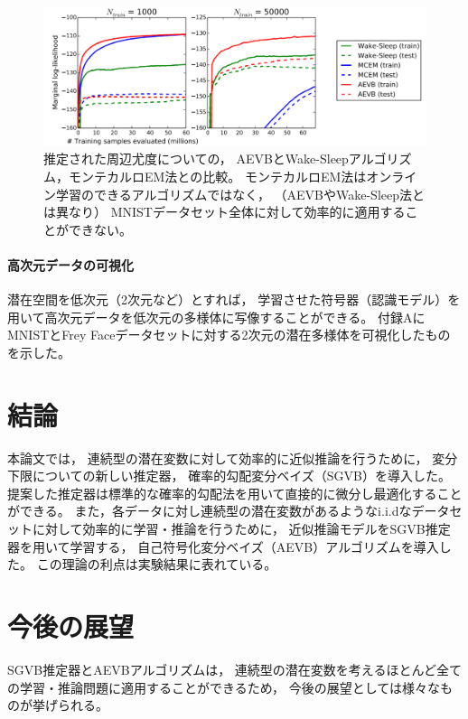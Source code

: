 \documentclass[dvipdfmx, fleqn, draft]{jsarticle}
\begin{document}
\begin{figure}
    \centering
    \includegraphics[clip, width=15cm]{../figures/comparison_MCMC}
    \caption{
        推定された周辺尤度についての，
        AEVBとWake-Sleepアルゴリズム，モンテカルロEM法との比較。
        モンテカルロEM法はオンライン学習のできるアルゴリズムではなく，
        （AEVBやWake-Sleep法とは異なり）
        MNISTデータセット全体に対して効率的に適用することができない。
        }
    \label{fig:comparison_MCMC}
\end{figure}


\paragraph{高次元データの可視化}

潜在空間を低次元（2次元など）とすれば，
学習させた符号器（認識モデル）を用いて高次元データを低次元の多様体に写像することができる。
付録AにMNISTとFrey Faceデータセットに対する2次元の潜在多様体を可視化したものを示した。



\section{結論}

本論文では，
連続型の潜在変数に対して効率的に近似推論を行うために，
変分下限についての新しい推定器，
確率的勾配変分ベイズ（SGVB）を導入した。
提案した推定器は標準的な確率的勾配法を用いて直接的に微分し最適化することができる。
また，各データに対し連続型の潜在変数があるようなi.i.dなデータセットに対して効率的に学習・推論を行うために，
近似推論モデルをSGVB推定器を用いて学習する，
自己符号化変分ベイズ（AEVB）アルゴリズムを導入した。
この理論の利点は実験結果に表れている。



\section{今後の展望}

SGVB推定器とAEVBアルゴリズムは，
連続型の潜在変数を考えるほとんど全ての学習・推論問題に適用することができるため，
今後の展望としては様々なものが挙げられる。
\end{document}
